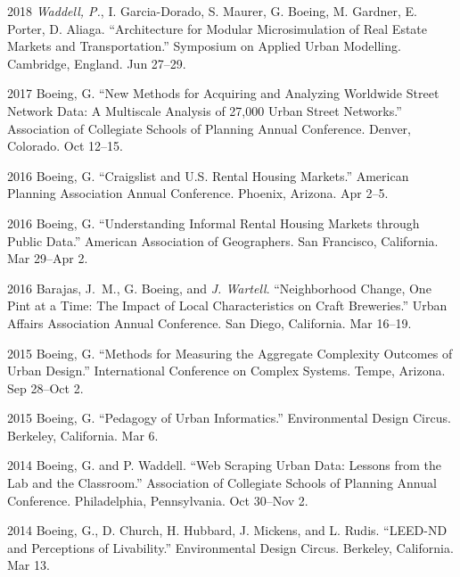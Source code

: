 \documentclass[12pt,letterpaper]{report}
\begin{document}
\begin{tablist}
		\item[2018] \tab \textit{Waddell, P.}, I. Garcia-Dorado, S. Maurer, G. Boeing, M. Gardner, E. Porter, D. Aliaga. \enquote{Architecture for Modular Microsimulation of Real Estate Markets and Transportation.} Symposium on Applied Urban Modelling. Cambridge, England. Jun 27--29.
		
		\item[2017] \tab Boeing, G. \enquote{New Methods for Acquiring and Analyzing Worldwide Street Network Data: A Multiscale Analysis of 27,000 Urban Street Networks.} Association of Collegiate Schools of Planning Annual Conference. Denver, Colorado. Oct 12--15.
		
		\item[2016] \tab Boeing, G. \enquote{Craigslist and U.S. Rental Housing Markets.} American Planning Association Annual Conference. Phoenix, Arizona. Apr 2--5.
		
		\item[2016] \tab Boeing, G. \enquote{Understanding Informal Rental Housing Markets through Public Data.} American Association of Geographers. San Francisco, California. Mar 29--Apr 2.
		
		\item[2016] \tab Barajas, J.~M., G. Boeing, and \textit{J. Wartell}. \enquote{Neighborhood Change, One Pint at a Time: The Impact of Local Characteristics on Craft Breweries.} Urban Affairs Association Annual Conference. San Diego, California. Mar 16--19.
		
		\item[2015] \tab Boeing, G. \enquote{Methods for Measuring the Aggregate Complexity Outcomes of Urban Design.} International Conference on Complex Systems. Tempe, Arizona. Sep 28--Oct 2.
		
		\item[2015] \tab Boeing, G. \enquote{Pedagogy of Urban Informatics.} Environmental Design Circus. Berkeley, California. Mar 6.
		
		\item[2014] \tab Boeing, G. and P. Waddell. \enquote{Web Scraping Urban Data: Lessons from the Lab and the Classroom.} Association of Collegiate Schools of Planning Annual Conference. Philadelphia, Pennsylvania. Oct 30--Nov 2.
		
		\item[2014] \tab Boeing, G., D. Church, H. Hubbard, J. Mickens, and L. Rudis. \enquote{LEED-ND and Perceptions of Livability.} Environmental Design Circus. Berkeley, California. Mar 13.
		
	\end{tablist}
	
\end{document}
